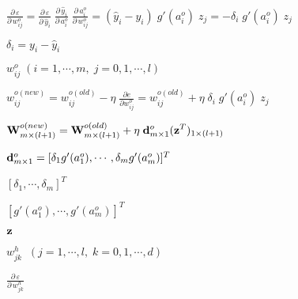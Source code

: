 \documentclass{article}
\def\lthtmlcheckvsize{\ifdim\ht\sizebox<\vsize 
  \ifdim\wd\sizebox<\hsize\expandafter\hfill\fi \expandafter\vfill
  \else\expandafter\vss\fi}%
\begin{document}
{\newpage\clearpage
{}%
$\displaystyle \frac{\partial\,\varepsilon}{\partial\, w_{ij}^o}
=\frac{\partial\,\varepsilon}{\partial\, \hat{y}_i}\;
\frac{\partial\, \hat{y}_i}{\partial\, a^o_i}\;
\frac{\partial\, a^o_i}{\partial\, w_{ij}^{o}}
=(\hat{y}_i-y_i)\;g'(a^o_i)\;z_j=-\delta_i\;g'(a^o_i)\;z_j$%
\lthtmlindisplaymathZ
\lthtmlcheckvsize\clearpage}

{\newpage\clearpage
{}%
$ \delta_i=y_i-\hat{y}_i$%
\lthtmlindisplaymathZ
\lthtmlcheckvsize\clearpage}

{\newpage\clearpage
{}%
$ w_{ij}^{o}\;(i=1,\cdots,m,\;j=0,1,\cdots,l)$%
\lthtmlindisplaymathZ
\lthtmlcheckvsize\clearpage}

{\newpage\clearpage
{}%
$\displaystyle w_{ij}^{o(new)}=w_{ij}^{o(old)}-\eta\;\frac{\partial e}{\partial w_{ij}^o}
=w_{ij}^{o(old)} +\eta\;\delta_i\;g'(a^o_i)\;z_j$%
\lthtmlindisplaymathZ
\lthtmlcheckvsize\clearpage}

{\newpage\clearpage
{}%
$\displaystyle {\bf W}^{o(new)}_{m\times (l+1)}
={\bf W}^{o(old)}_{m\times (l+1)}+\eta\;{\bf d}^o_{m\times 1}({\bf z}^T)_{1\times (l+1)}$%
\lthtmlindisplaymathZ
\lthtmlcheckvsize\clearpage}

{\newpage\clearpage
{}%
$ {\bf d}^o_{m\times 1}=[\delta_1 g'(a^o_1),\cdots,\delta_m g'(a^o_m)]^T$%
\lthtmlindisplaymathZ
\lthtmlcheckvsize\clearpage}

{\newpage\clearpage
{}%
$ [\delta_1,\cdots,\delta_m]^T$%
\lthtmlindisplaymathZ
\lthtmlcheckvsize\clearpage}

{\newpage\clearpage
{}%
$ [g'(a_1^o),\cdots,g'(a_m^o)]^T$%
\lthtmlindisplaymathZ
\lthtmlcheckvsize\clearpage}

{\newpage\clearpage
{}%
$ {\bf z}$%
\lthtmlindisplaymathZ
\lthtmlcheckvsize\clearpage}

{\newpage\clearpage
{}%
$ w_{jk}^h\;\;(j=1,\cdots,l,\;k=0,1,\cdots,d)$%
\lthtmlindisplaymathZ
\lthtmlcheckvsize\clearpage}

{\newpage\clearpage
{}%
$\displaystyle \frac{\partial\,\varepsilon}{\partial\, w_{jk}^h}$%
\lthtmlindisplaymathZ
\lthtmlcheckvsize\clearpage}
\end{document}
